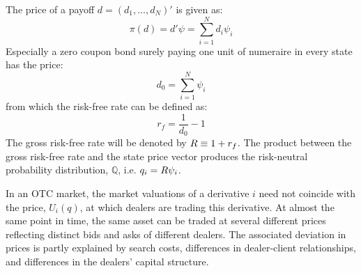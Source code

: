 \documentclass[main.tex]{subfiles}
\begin{document}
        The price of a payoff $d=\left(d_{1}, \dots, d_{N}\right)'$ is given as:
            \begin{equation}
                \pi(d) = d'\psi = \sum_{i=1}^{N} d_{i}\psi_{i}
            \end{equation}
        Especially a zero coupon bond surely paying one unit of numeraire in every state has the price:
            \begin{equation}
                d_{0} = \sum_{i=1}^{N} \psi_{i}
            \end{equation}
        from which the risk-free rate can be defined as:
            \begin{equation}
                r_{f} = \frac{1}{d_{0}} - 1
            \end{equation}
        The gross risk-free rate will be denoted by $R \equiv 1 + r_{f}$.
        The product between the gross risk-free rate and the state price vector produces the risk-neutral probability distribution, $\mathbb{Q}$, i.e. $q_{i} = R\psi_{i}$.

        In an OTC market, the market valuations of a derivative $i$ need not coincide with the price, $U_{i}(q)$, at which dealers are trading this derivative.
        At almost the same point in time, the same asset can be traded at several different prices reflecting distinct bids and asks of different dealers.
        The associated deviation in prices is partly explained by search costs, differences in dealer-client relationships, and differences in the dealers' capital structure.
\end{document}
